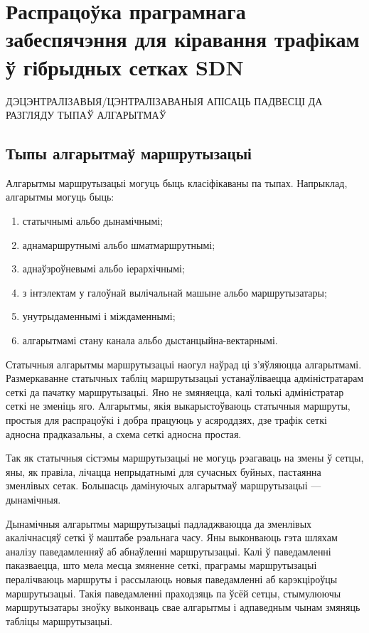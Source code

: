 \section{Распрацоўка праграмнага забеспячэння для кіравання трафікам ў гібрыдных сетках SDN}

ДЭЦЭНТРАЛІЗАВЫЯ/ЦЭНТРАЛІЗАВАНЫЯ АПІСАЦЬ
ПАДВЕСЦІ ДА РАЗГЛЯДУ ТЫПАЎ АЛГАРЫТМАЎ

\subsection{Тыпы алгарытмаў маршрутызацыі}

Алгарытмы маршрутызацыі могуць быць класіфікаваны па тыпах.
Напрыклад, алгарытмы могуць быць:
\begin{enumerate}
    \item статычнымі альбо дынамічнымі;
    \item аднамаршрутнымі альбо шматмаршрутнымі;
    \item аднаўзроўневымі альбо іерархічнымі;
    \item з інтэлектам у галоўнай вылічальнай машыне альбо маршрутызатары;
    \item унутрыдаменнымі і міждаменнымі;
    \item алгарытмамі стану канала альбо дыстанцыйна-вектарнымі.
\end{enumerate}

Статычныя алгарытмы маршрутызацыі наогул наўрад ці з'яўляюцца
алгарытмамі.
Размеркаванне статычных табліц маршрутызацыі
устанаўліваецца адміністратарам сеткі да пачатку маршрутызацыі. Яно не
змяняецца, калі толькі адміністратар сеткі не зменіць яго. Алгарытмы,
якія выкарыстоўваюць статычныя маршруты, простыя для распрацоўкі і добра
працуюць у асяроддзях, дзе трафік сеткі адносна прадказальны, а схема
сеткі адносна простая.

Так як статычныя сістэмы маршрутызацыі не могуць рэагаваць на
змены ў сетцы, яны, як правіла, лічацца непрыдатнымі для сучасных
буйных, пастаянна зменлівых сетак. Большасць дамінуючых
алгарытмаў маршрутызацыі --- дынамічныя.

Дынамічныя алгарытмы маршрутызацыі падладжваюцца да зменлівых акалічнасцяў сеткі ў маштабе рэальнага часу. Яны выконваюць гэта шляхам аналізу паведамленняў аб абнаўленні маршрутызацыі. Калі ў паведамленні паказваецца, што мела месца змяненне сеткі, праграмы маршрутызацыі пералічваюць маршруты і рассылаюць новыя паведамленні аб карэкціроўцы маршрутызацыі. Такія паведамленні праходзяць па ўсёй сетцы, стымулюючы маршрутызатары зноўку выконваць свае алгарытмы і адпаведным чынам змяняць табліцы маршрутызацыі.

